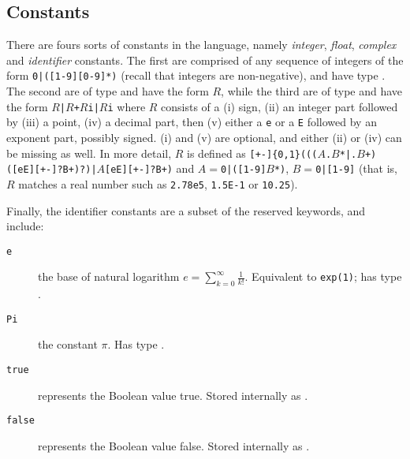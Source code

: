 \subsection{Constants}
There are fours sorts of constants in the language, namely \emph{integer}, \emph{float}, \emph{complex} and \emph{identifier} constants. The first are comprised of any sequence of integers of the form \texttt{0|([1-9][0-9]*)} (recall that integers are non-negative), and have type \integ. The second are of type \float  and have the form \texttt{$R$}, while the third are of type \complex and have the form 
\texttt{$R$|$R$+$R$i|$R$i}
where $R$ consists of a \textsf{(i)} sign, \textsf{(ii)} an integer part followed by \textsf{(iii)} a point, \textsf{(iv)} a decimal part, then  \textsf{(v)} either a \texttt{e} or a \texttt{E} followed by an exponent part, possibly signed. \textsf{(i)} and \textsf{(v)} are optional, and either \textsf{(ii)} or \textsf{(iv)} can be missing as well. In more detail, $R$ 
is defined as \texttt{[+-]\{0,1\}((($A$.$B$*|.$B$+)([eE][+-]?B+)?)|$A$[eE][+-]?B+)} and $A=$\texttt{0|([1-9]$B$*)}, $B=$\texttt{0|[1-9]} (that is, $R$ matches a real number such as \texttt{2.78e5}, \texttt{1.5E-1} or \texttt{10.25}).

\noindent Finally, the identifier constants are a subset of the reserved keywords, and include:
\begin{description}
  \item[\texttt{e}] the base of natural logarithm $e=\sum_{k=0}^\infty \frac{1}{k!}$. Equivalent to \texttt{exp(1)}; has type \complex.
  \item[\texttt{Pi}] the constant $\pi$. Has type \complex.
  \item[\texttt{true}] represents the Boolean value \textsf{true}. Stored internally  as .
  \item[\texttt{false}] represents the Boolean value \textsf{false}. Stored internally  as .
\end{description}

